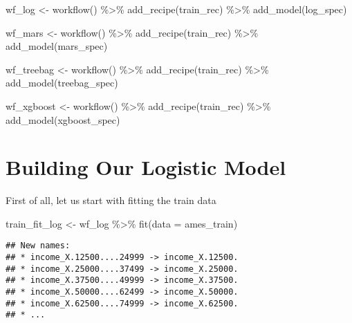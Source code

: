 \documentclass[
]{article}
\newenvironment{Shaded}{\begin{snugshade}}{\end{snugshade}}
\newcommand{\AttributeTok}[1]{\textcolor[rgb]{0.77,0.63,0.00}{#1}}
\newcommand{\FunctionTok}[1]{\textcolor[rgb]{0.00,0.00,0.00}{#1}}
\newcommand{\NormalTok}[1]{#1}
\newcommand{\OtherTok}[1]{\textcolor[rgb]{0.56,0.35,0.01}{#1}}
\newcommand{\SpecialCharTok}[1]{\textcolor[rgb]{0.00,0.00,0.00}{#1}}
\begin{document}
\begin{Shaded}
\begin{Highlighting}[]
\NormalTok{wf\_log }\OtherTok{\textless{}{-}} \FunctionTok{workflow}\NormalTok{() }\SpecialCharTok{\%\textgreater{}\%} 
\FunctionTok{add\_recipe}\NormalTok{(train\_rec) }\SpecialCharTok{\%\textgreater{}\%} 
\FunctionTok{add\_model}\NormalTok{(log\_spec)}

\NormalTok{wf\_mars }\OtherTok{\textless{}{-}} \FunctionTok{workflow}\NormalTok{() }\SpecialCharTok{\%\textgreater{}\%} 
\FunctionTok{add\_recipe}\NormalTok{(train\_rec) }\SpecialCharTok{\%\textgreater{}\%} 
\FunctionTok{add\_model}\NormalTok{(mars\_spec)}

\NormalTok{wf\_treebag }\OtherTok{\textless{}{-}} \FunctionTok{workflow}\NormalTok{() }\SpecialCharTok{\%\textgreater{}\%} 
\FunctionTok{add\_recipe}\NormalTok{(train\_rec) }\SpecialCharTok{\%\textgreater{}\%} 
\FunctionTok{add\_model}\NormalTok{(treebag\_spec)}

\NormalTok{wf\_xgboost }\OtherTok{\textless{}{-}} \FunctionTok{workflow}\NormalTok{() }\SpecialCharTok{\%\textgreater{}\%} 
\FunctionTok{add\_recipe}\NormalTok{(train\_rec) }\SpecialCharTok{\%\textgreater{}\%} 
\FunctionTok{add\_model}\NormalTok{(xgboost\_spec)}
\end{Highlighting}
\end{Shaded}

\hypertarget{building-our-logistic-model}{%
\section{Building Our Logistic
Model}\label{building-our-logistic-model}}

First of all, let us start with fitting the train data

\begin{Shaded}
\begin{Highlighting}[]
\NormalTok{train\_fit\_log }\OtherTok{\textless{}{-}} 
\NormalTok{  wf\_log }\SpecialCharTok{\%\textgreater{}\%} 
  \FunctionTok{fit}\NormalTok{(}\AttributeTok{data =}\NormalTok{ ames\_train)}
\end{Highlighting}
\end{Shaded}

\begin{verbatim}
## New names:
## * income_X.12500....24999 -> income_X.12500.
## * income_X.25000....37499 -> income_X.25000.
## * income_X.37500....49999 -> income_X.37500.
## * income_X.50000....62499 -> income_X.50000.
## * income_X.62500....74999 -> income_X.62500.
## * ...
\end{verbatim}
\end{document}
